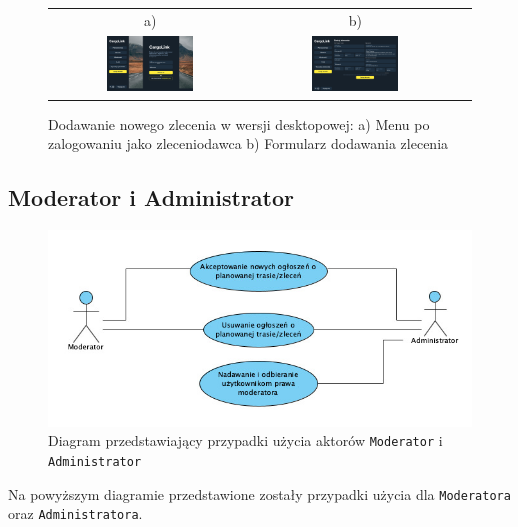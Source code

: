 \begin{figure}[H]
 \centering
  \begin{tabular}{@{}ccc@{}}
  a) & b)\\
  \includegraphics[width=0.45\textwidth]{rozdzial1/menu_d_zleceniodawca.jpg} &
  \includegraphics[width=0.45\textwidth]{rozdzial1/dodaj_zlecenie_d.jpg}
  \end{tabular}
 \caption{Dodawanie nowego zlecenia w wersji desktopowej: a) Menu po zalogowaniu jako zleceniodawca b) Formularz dodawania zlecenia}
 \label{Rys. fig:Dodawanie nowego zlecenia - ab - desktop}
\end{figure}

\subsection{Moderator i Administrator}
\begin{figure}[H]
	\centering
		\includegraphics[width=\linewidth]{rozdzial1/PU_moderator_administrator.jpg}
	\caption{Diagram przedstawiający przypadki użycia aktorów \texttt{Moderator} i \texttt{Administrator}}
	\label{PU moderator administrator}
\end{figure}
Na powyższym diagramie przedstawione zostały przypadki użycia dla \texttt{Moderatora} oraz \texttt{Administratora}.  \\

